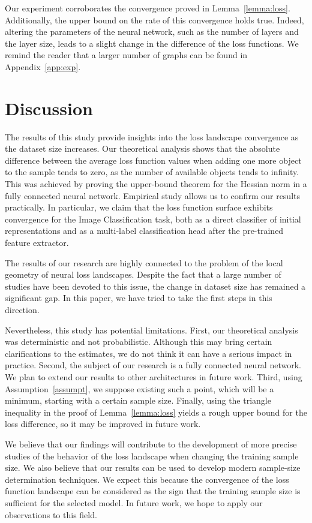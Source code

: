 \documentclass{article}
\begin{document}
Our experiment corroborates the convergence proved in Lemma~\ref{lemma:loss}. Additionally, the upper bound on the rate of this convergence holds true. Indeed, altering the parameters of the neural network, such as the number of layers and the layer size, leads to a slight change in the difference of the loss functions. We remind the reader that a larger number of graphs can be found in Appendix~\ref{app:exp}.

\section{Discussion}\label{sec:disc}

The results of this study provide insights into the loss landscape convergence as the dataset size increases. Our theoretical analysis shows that the absolute difference between the average loss function values when adding one more object to the sample tends to zero, as the number of available objects tends to infinity. This was achieved by proving the upper-bound theorem for the Hessian norm in a fully connected neural network. Empirical study allows us to confirm our results practically. In particular, we claim that the loss function surface exhibits convergence for the Image Classification task, both as a direct classifier of initial representations and as a multi-label classification head after the pre-trained feature extractor. 

The results of our research are highly connected to the problem of the local geometry of neural loss landscapes. Despite the fact that a large number of studies have been devoted to this issue, the change in dataset size has remained a significant gap. In this paper, we have tried to take the first steps in this direction. 

Nevertheless, this study has potential limitations. First, our theoretical analysis was deterministic and not probabilistic. Although this may bring certain clarifications to the estimates, we do not think it can have a serious impact in practice. Second, the subject of our research is a fully connected neural network. We plan to extend our results to other architectures in future work. Third, using Assumption~\ref{assumpt}, we suppose existing such a point, which will be a minimum, starting with a certain sample size. Finally, using the triangle inequality in the proof of Lemma~\ref{lemma:loss} yields a rough upper bound for the loss difference, so it may be improved in future work. 

We believe that our findings will contribute to the development of more precise studies of the behavior of the loss landscape when changing the training sample size. We also believe that our results can be used to develop modern sample-size determination techniques. We expect this because the convergence of the loss function landscape can be considered as the sign that the training sample size is sufficient for the selected model. In future work, we hope to apply our observations to this field.
\end{document}

